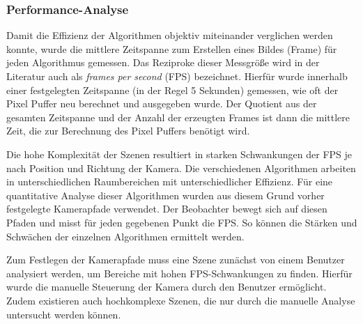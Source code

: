 \documentclass[crop=false]{standalone}
\begin{document}
      \subsubsection{Performance-Analyse} %
      \label{ssub:performance_analyse}
        Damit die Effizienz der Algorithmen objektiv miteinander verglichen werden konnte, wurde die mittlere Zeitspanne zum Erstellen eines Bildes (Frame) für jeden Algorithmus gemessen.
        Das Reziproke dieser Messgröße wird in der Literatur auch als \textit{frames per second} (FPS) bezeichnet.
        Hierfür wurde innerhalb einer festgelegten Zeitspanne (in der Regel 5 Sekunden) gemessen, wie oft der Pixel Puffer neu berechnet und ausgegeben wurde.
        Der Quotient aus der gesamten Zeitspanne und der Anzahl der erzeugten Frames ist dann die mittlere Zeit, die zur Berechnung des Pixel Puffers benötigt wird.

        Die hohe Komplexität der Szenen resultiert in starken Schwankungen der FPS je nach Position und Richtung der Kamera.
        Die verschiedenen Algorithmen arbeiten in unterschiedlichen Raumbereichen mit unterschiedlicher Effizienz.
        Für eine quantitative Analyse dieser Algorithmen wurden aus diesem Grund vorher festgelegte Kamerapfade verwendet.
        Der Beobachter bewegt sich auf diesen Pfaden und misst für jeden gegebenen Punkt die FPS.
        So können die Stärken und Schwächen der einzelnen Algorithmen ermittelt werden.

        Zum Festlegen der Kamerapfade muss eine Szene zunächst von einem Benutzer analysiert werden, um Bereiche mit hohen FPS-Schwankungen zu finden.
        Hierfür wurde die manuelle Steuerung der Kamera durch den Benutzer ermöglicht.
        Zudem existieren auch hochkomplexe Szenen, die nur durch die manuelle Analyse untersucht werden können.
\end{document}
